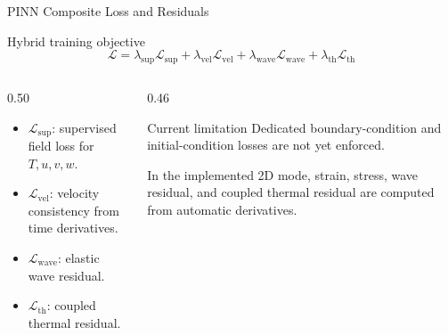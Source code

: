 \documentclass[aspectratio=169,10pt]{beamer}
\begin{document}
\begin{frame}{PINN Composite Loss and Residuals}
  \begin{block}{Hybrid training objective}
    \[
      \mathcal{L}
      =
      \lambda_{\mathrm{sup}}\mathcal{L}_{\mathrm{sup}}
      +
      \lambda_{\mathrm{vel}}\mathcal{L}_{\mathrm{vel}}
      +
      \lambda_{\mathrm{wave}}\mathcal{L}_{\mathrm{wave}}
      +
      \lambda_{\mathrm{th}}\mathcal{L}_{\mathrm{th}}
    \]
  \end{block}
  \begin{columns}[T]
    \begin{column}{0.50\textwidth}
      \footnotesize
      \begin{itemize}
        \item $\mathcal{L}_{\mathrm{sup}}$: supervised field loss for
              $T,u,v,w$.
        \item $\mathcal{L}_{\mathrm{vel}}$: velocity consistency from time
              derivatives.
        \item $\mathcal{L}_{\mathrm{wave}}$: elastic wave residual.
        \item $\mathcal{L}_{\mathrm{th}}$: coupled thermal residual.
      \end{itemize}
    \end{column}
    \begin{column}{0.46\textwidth}
      \begin{alertblock}{Current limitation}
        \footnotesize
        Dedicated boundary-condition and initial-condition losses are not yet
        enforced.
      \end{alertblock}
      \scriptsize
      In the implemented 2D mode, strain, stress, wave residual, and coupled
      thermal residual are computed from automatic derivatives.
    \end{column}
  \end{columns}
\end{frame}
\end{document}
